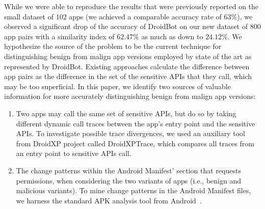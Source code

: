 While we were able to reproduce the results that were previously reported 
on the small dataset of $102$ apps (we achieved a comparable accuracy rate of $63\%$), we observed a significant drop of the accuracy of DroidBot on our new dataset of $800$ app pairs with a similarity index of $62.47\%$ as much as down to $24.12\%$.
%
We hypothesize the source of the problem to be the current technique 
for distinguishing benign from malign app versions employed 
by state of the art as represented by
DroidBot. Existing approaches calculate the
difference between app pairs as
the difference in the set of the sensitive APIs 
that they call, which may be too superficial.
In this paper, we identify two 
sources of valuable information for more accurately
distinguishing benign from malign app versions:

\begin{enumerate}
    \item Two apps may call the same set of sensitive APIs, but do so by taking different dynamic call traces between the app's entry point and the sensitive APIs. To investigate possible trace divergences, we used an auxiliary tool from DroidXP project called DroidXPTrace, which compares all traces from an entry point to sensitive APIs call.
    \item The {\color{blue}change patterns} within the Android Manifest' section that requests permissions, when considering the two variants of apps (i.e., benign and malicious variants). To {\color{blue}mine change patterns} in the Android Manifest files, we harness the standard APK analysis tool from Android~\cite{au2011short}. 
\end{enumerate}


